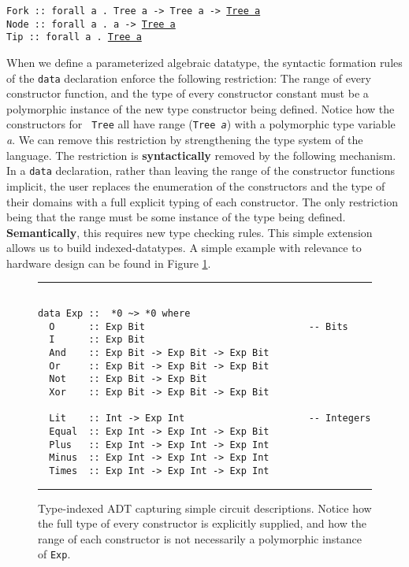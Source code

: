 \documentclass[10pt,twoside]{article}
\begin{document}
\noindent
{\tt Fork :: forall a . Tree a -> Tree a -> \underline{Tree a}}\\
{\tt Node :: forall a . a -> \underline{Tree a}}\\
{\tt Tip :: forall a . \underline{Tree a}}

When we define a parameterized algebraic datatype, the syntactic
formation rules of the {\tt data} declaration
enforce the following restriction: The range of every constructor function,
and the type of every constructor constant must be a polymorphic instance of
the new type constructor being defined. Notice how the constructors for {\tt
Tree} all have range ({\tt Tree {\it a}}) with a polymorphic type variable
{\it a}.  We can remove this restriction by strengthening the type system of the
language. The restriction is {\bf syntactically} removed by the following mechanism. In a 
{\tt data} declaration, rather than leaving the range of the constructor functions
implicit, the user replaces the enumeration of the constructors and the
type of their domains with a full explicit typing of each constructor.
The only restriction being that the range must be some instance of
the type being defined. {\bf Semantically}, this requires new type checking
rules. This simple extension allows us to build indexed-datatypes. A simple example
with relevance to hardware design can be found in Figure \ref{simple}.

\begin{figure}
\hrule
{\small
\begin{verbatim}

data Exp ::  *0 ~> *0 where
  O      :: Exp Bit                             -- Bits
  I      :: Exp Bit
  And    :: Exp Bit -> Exp Bit -> Exp Bit
  Or     :: Exp Bit -> Exp Bit -> Exp Bit
  Not    :: Exp Bit -> Exp Bit
  Xor    :: Exp Bit -> Exp Bit -> Exp Bit
  
  Lit    :: Int -> Exp Int                      -- Integers
  Equal  :: Exp Int -> Exp Int -> Exp Bit
  Plus   :: Exp Int -> Exp Int -> Exp Int
  Minus  :: Exp Int -> Exp Int -> Exp Int
  Times  :: Exp Int -> Exp Int -> Exp Int
\end{verbatim}}
\vspace*{-0.2in}
\caption{Type-indexed ADT capturing simple circuit descriptions.
Notice how the full type of every constructor is explicitly supplied, and how the range of
each constructor is not necessarily a polymorphic instance of {\tt Exp}.}\label{simple}
\hrule
\end{figure}
\end{document}
